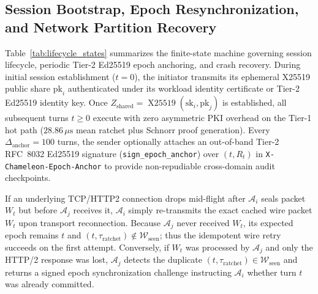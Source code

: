 \documentclass[conference,10pt]{IEEEtran}
\begin{document}
\subsection{Session Bootstrap, Epoch Resynchronization, and Network Partition Recovery}
Table~\ref{tab:lifecycle_states} summarizes the finite-state machine governing session lifecycle, periodic Tier-2 Ed25519 epoch anchoring, and crash recovery. During initial session establishment ($t = 0$), the initiator transmits its ephemeral X25519 public share $\text{pk}_i$ authenticated under its workload identity certificate or Tier-2 Ed25519 identity key. Once $Z_{\text{shared}} = \operatorname{X25519}(\text{sk}_i, \text{pk}_j)$ is established, all subsequent turns $t \ge 0$ execute with zero asymmetric PKI overhead on the Tier-1 hot path ($28.86\,\mu\text{s}$ mean ratchet plus Schnorr proof generation). Every $\Delta_{\text{anchor}} = 100$ turns, the sender optionally attaches an out-of-band Tier-2 RFC~8032 Ed25519 signature (\texttt{sign\_epoch\_anchor}) over $(t, R_t)$ in \texttt{X-Chameleon-Epoch-Anchor} to provide non-repudiable cross-domain audit checkpoints.

If an underlying TCP/HTTP2 connection drops mid-flight after $\mathcal{A}_i$ seals packet $W_t$ but before $\mathcal{A}_j$ receives it, $\mathcal{A}_i$ simply re-transmits the exact cached wire packet $W_t$ upon transport reconnection. Because $\mathcal{A}_j$ never received $W_t$, its expected epoch remains $t$ and $(t, \tau_{\text{ratchet}}) \notin \mathcal{W}_{\text{seen}}$; thus the idempotent wire retry succeeds on the first attempt. Conversely, if $W_t$ was processed by $\mathcal{A}_j$ and only the HTTP/2 response was lost, $\mathcal{A}_j$ detects the duplicate $(t, \tau_{\text{ratchet}}) \in \mathcal{W}_{\text{seen}}$ and returns a signed epoch synchronization challenge instructing $\mathcal{A}_i$ whether turn $t$ was already committed.
\end{document}
